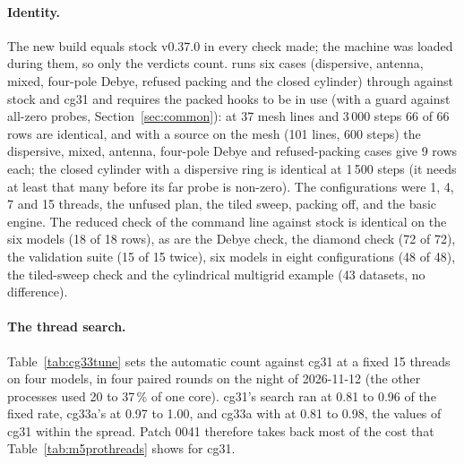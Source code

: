 \paragraph{Identity.} The new build equals stock v0.37.0 in every check made; the machine was loaded during them, so
only the verdicts count.  runs six cases (dispersive, antenna, mixed, four-pole Debye, refused packing and the closed cylinder) through  against
stock and cg31 and requires the packed hooks to be in use (with a guard against all-zero probes, Section~\ref{sec:common}): at
37 mesh lines and 3\,000 steps 66 of 66 rows are identical, and with a source on the mesh (101 lines, 600 steps) the
dispersive, mixed, antenna, four-pole Debye and refused-packing cases give 9 rows each; the closed cylinder with a
dispersive ring is identical at 1\,500 steps (it needs at least that many before its far probe is non-zero). The configurations
were 1, 4, 7 and 15 threads, the unfused plan, the tiled sweep, packing off,  and the basic engine. The
reduced check of the command line against stock is identical on the six models (18 of 18 rows), as are the Debye check, the
diamond check (72 of 72), the validation suite (15 of 15 twice), six models in eight configurations (48 of 48), the tiled-sweep
check and the cylindrical multigrid example (43 datasets, no difference).

\paragraph{The thread search.} Table~\ref{tab:cg33tune} sets the automatic count against cg31 at a fixed 15 threads on four
models, in four paired rounds on the night of 2026-11-12 (the other processes used 20 to 37\,\% of one core).
cg31's search ran at 0.81 to 0.96 of the fixed rate, cg33a's at 0.97 to 1.00, and cg33a with
 at 0.81 to 0.98, the values of cg31 within the spread. Patch 0041 therefore takes back most of
the cost that Table~\ref{tab:m5prothreads} shows for cg31.


